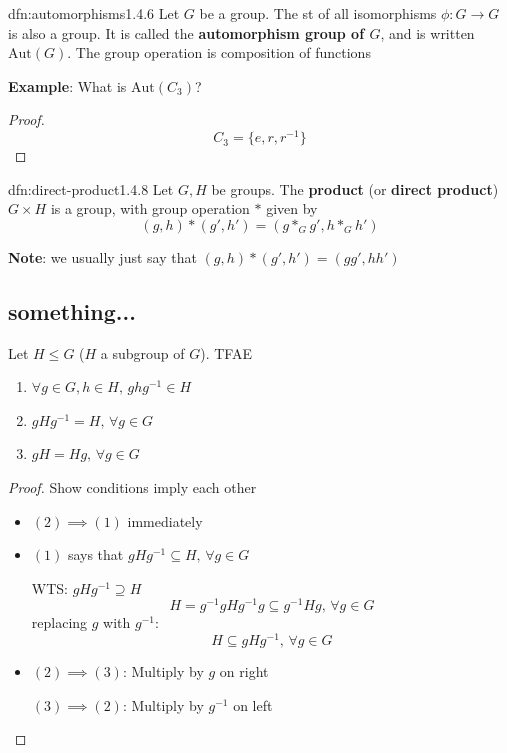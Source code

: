 \documentclass{article}
\begin{document}
\begin{dfn}[Automorphisms]{dfn:automorphisms}{1.4.6}
    Let $G$ be a group. The st of all isomorphisms $\phi : G \to G$ is also a group. It is called the \textbf{automorphism group of $G$}, and is written $\mathrm{Aut}(G)$. The group operation is composition of functions
\end{dfn}

\textbf{Example}: What is $\mathrm{Aut}(C_{3})$?
\begin{proof}
    \[C_{3} = \{e, r, r^{-1}\}\]
\end{proof}

\begin{dfn}{dfn:direct-product}{1.4.8}
    Let $G, H$ be groups. The \textbf{product} (or \textbf{direct product}) $G \times H$ is a group, with group operation $*$ given by
    \[(g, h) * (g', h') = (g *_{G} g', h *_{G} h')\]

    \textbf{Note}: we usually just say that $(g, h) * (g', h') = (gg', hh')$
\end{dfn}

\subsection{something...}
Let $H \le G$ ($H$ a subgroup of $G$). TFAE
\begin{enumerate}
    \item $\forall g\in G, h\in H,\, ghg^{-1}\in H$ 
    \item $gHg^{-1} = H,\,\forall g\in G$
    \item $gH = Hg,\, \forall g\in G$
\end{enumerate}

\begin{proof}
    Show conditions imply each other
    \begin{itemize}
        \item $(2) \implies (1)$ immediately
        \item $(1)$ says that $gHg^{-1} \subseteq H,\,\forall g\in G$

            WTS: $gHg^{-1} \supseteq H$
            \[H = g^{-1}gHg^{-1}g \subseteq g^{-1}Hg,\,\forall g\in G\]
            replacing $g$ with $g^{-1}$:
            \[H \subseteq gHg^{-1},\,\forall g\in G\]
        \item $(2) \implies (3)$: Multiply by $g$ on right

            $(3) \implies (2)$: Multiply by $g^{-1}$ on left
    \end{itemize}
\end{proof}
\end{document}
